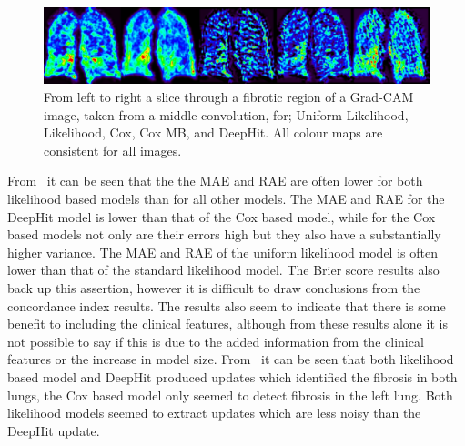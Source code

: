 \begin{table}
    \end{table}

    \begin{figure}
        
        \centering

        \includegraphics[width=1.0\linewidth]{Figures/grad_cam.jpg}
        
        \vspace{-0.25cm}
        
        \captionsetup{singlelinecheck=false, justification=centering}
        \caption{
            \scriptsize
            From left to right a slice through a fibrotic region of a Grad-CAM image, taken from a middle convolution, for; Uniform Likelihood, Likelihood, Cox, Cox \gls{MB}, and DeepHit. All colour maps are consistent for all images.
        }
        \label{fig:grad_cam}
        
       \vspace{-0.5cm}
   \end{figure}

    From~ it can be seen that the the \gls{MAE} and \gls{RAE} are often lower for both likelihood based models than for all other models. The \gls{MAE} and \gls{RAE} for the DeepHit model is lower than that of the Cox based model, while for the Cox based models not only are their errors high but they also have a substantially higher variance. The \gls{MAE} and \gls{RAE} of the uniform likelihood model is often lower than that of the standard likelihood model. The Brier score results also back up this assertion, however it is difficult to draw conclusions from the concordance index results. The results also seem to indicate that there is some benefit to including the clinical features, although from these results alone it is not possible to say if this is due to the added information from the clinical features or the increase in model size. From~ it can be seen that both likelihood based model and DeepHit produced updates which identified the fibrosis in both lungs, the Cox based model only seemed to detect fibrosis in the left lung. Both likelihood models seemed to extract updates which are less noisy than the DeepHit update.
